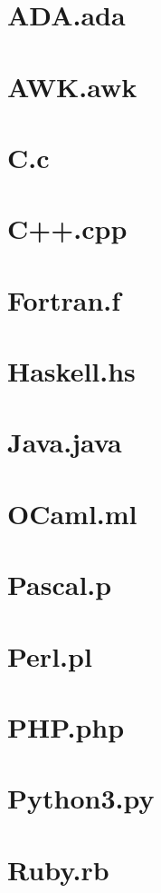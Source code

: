 \documentclass{article}
\begin{document}
\section*{ADA.ada}


\section*{AWK.awk}


\section*{C.c}


\section*{C++.cpp}


\section*{Fortran.f}


\section*{Haskell.hs}


\section*{Java.java}


\section*{OCaml.ml}


\section*{Pascal.p}


\section*{Perl.pl}


\section*{PHP.php}


\section*{Python3.py}


\section*{Ruby.rb}

\end{document}
